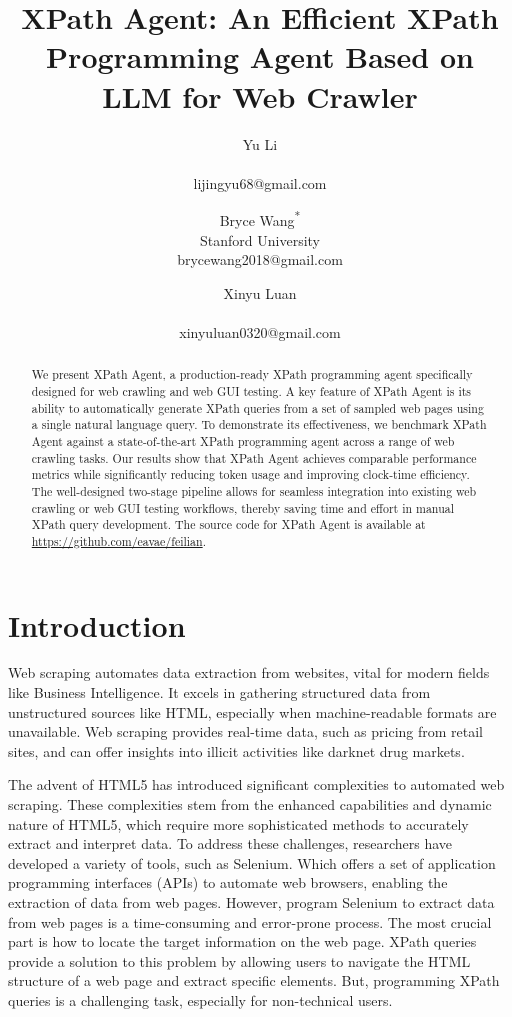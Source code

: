 \documentclass[a4paper]{article}
\title{XPath Agent: An Efficient XPath Programming Agent Based on LLM for Web Crawler}
\author{
Yu Li \\ \\ lijingyu68@gmail.com
\and
Bryce Wang\textsuperscript{*} \\ Stanford University  \\ brycewang2018@gmail.com
\and
Xinyu Luan \\ \\ xinyuluan0320@gmail.com
}
\begin{document}
\maketitle

\begin{abstract}
We present XPath Agent, a production-ready XPath programming agent specifically designed for web crawling and web GUI testing. A key feature of XPath Agent is its ability to automatically generate XPath queries from a set of sampled web pages using a single natural language query. To demonstrate its effectiveness, we benchmark XPath Agent against a state-of-the-art XPath programming agent across a range of web crawling tasks. Our results show that XPath Agent achieves comparable performance metrics while significantly reducing token usage and improving clock-time efficiency. The well-designed two-stage pipeline allows for seamless integration into existing web crawling or web GUI testing workflows, thereby saving time and effort in manual XPath query development. The source code for XPath Agent is available at \url{https://github.com/eavae/feilian}.
\end{abstract}

\section{Introduction}

Web scraping\cite{khder2021web} automates data extraction from websites, vital for modern fields like Business Intelligence. It excels in gathering structured data from unstructured sources like HTML, especially when machine-readable formats are unavailable. Web scraping provides real-time data, such as pricing from retail sites, and can offer insights into illicit activities like darknet drug markets.

The advent of HTML5\cite{TABARES2021101529} has introduced significant complexities to automated web scraping. These complexities stem from the enhanced capabilities and dynamic nature of HTML5, which require more sophisticated methods to accurately extract and interpret data. To address these challenges, researchers have developed a variety of tools, such as Selenium\cite{selenium}. Which offers a set of application programming interfaces (APIs) to automate web browsers, enabling the extraction of data from web pages. However, program Selenium to extract data from web pages is a time-consuming and error-prone process. The most crucial part is how to locate the target information on the web page. XPath queries provide a solution to this problem by allowing users to navigate the HTML structure of a web page and extract specific elements. But, programming XPath queries is a challenging task, especially for non-technical users.
\end{document}
